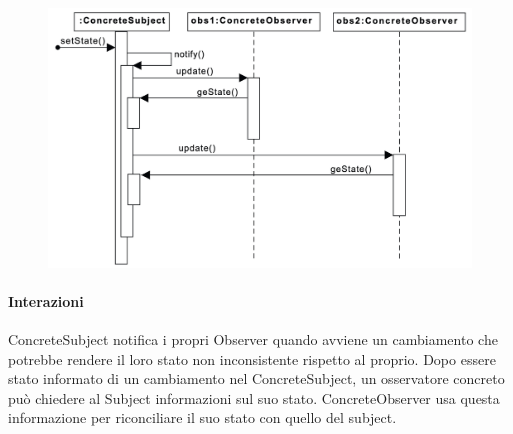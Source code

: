 \begin{figure}[H]
    \centering
    \includegraphics[width=1\linewidth]{assets/pattern/observer/observer-activity.png}
\end{figure}

\paragraph{Interazioni} ConcreteSubject notifica i propri Observer quando avviene un cambiamento che potrebbe rendere il loro stato non inconsistente rispetto al proprio. Dopo essere stato informato di un cambiamento nel ConcreteSubject, un osservatore concreto può chiedere al Subject informazioni sul suo stato. ConcreteObserver usa questa informazione per riconciliare il suo stato con quello del subject.

\newpage